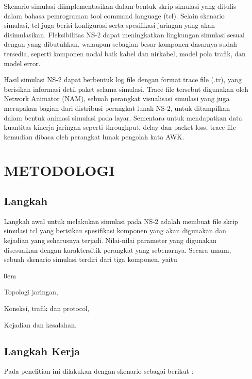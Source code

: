 \documentclass{jtetiproposalskripsi}
\begin{document}
Skenario simulasi diimplementasikan dalam bentuk skrip simulasi yang ditulis dalam bahasa pemrograman tool command language (tcl). Selain skenario simulasi, tcl juga berisi konfigurasi serta spesifikasi jaringan yang akan disimulasikan. Fleksibilitas NS-2 dapat meningkatkan lingkungan simulasi sesuai dengan yang dibutuhkan, walaupun sebagian besar komponen dasarnya sudah tersedia, seperti komponen nodal baik kabel dan nirkabel, model pola trafik, dan model error.

Hasil simulasi NS-2 dapat berbentuk log file dengan format trace file (.tr), yang berisikan informasi detil paket selama simulasi. Trace file tersebut digunakan oleh Network Animator (NAM), sebuah perangkat visualisasi simulasi yang juga merupakan bagian dari distribusi perangkat lunak NS-2, untuk ditampilkan dalam bentuk animasi simulasi pada layar. Sementara untuk mendapatkan data kuantitas kinerja jaringan seperti throughput, delay dan packet loss, trace file kemudian dibaca oleh perangkat lunak pengolah kata AWK.


\chapter{METODOLOGI}

\section{Langkah}
Langkah awal untuk melakukan simulasi pada NS-2 adalah membuat file skrip simulasi tcl yang berisikan spesifikasi komponen yang akan digunakan dan kejadian yang seharusnya terjadi. Nilai-nilai parameter yang digunakan disesuaikan dengan karaktersitik perangkat yang sebenarnya. Secara umum, sebuah skenario simulasi terdiri dari tiga komponen, yaitu

\vspace{-0.5cm}

\begin{enumerate}[a.]
\begin{singlespace}
\itemsep0em
\item Topologi jaringan,
\item Koneksi, trafik dan protocol,
\item Kejadian dan kesalahan.
\end{singlespace}
\end{enumerate}


\section{Langkah Kerja}
Pada penelitian ini dilakukan dengan skenario sebagai berikut :
\end{document}
